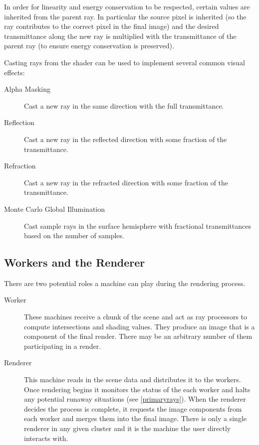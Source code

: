 \documentclass[12pt]{ucthesis}
\begin{document}
In order for linearity and energy conservation to be respected, certain values
are inherited from the parent ray. In particular the source pixel is inherited
(so the ray contributes to the correct pixel in the final image) and the
desired transmittance along the new ray is multiplied with the transmittance of
the parent ray (to ensure energy conservation is preserved).

Casting rays from the shader can be used to implement several common visual
effects:

\begin{description}
    \item[Alpha Masking] Cast a new ray in the same direction with the full
        transmittance.
    \item[Reflection] Cast a new ray in the reflected direction with some
        fraction of the transmittance.
    \item[Refraction] Cast a new ray in the refracted direction with some
        fraction of the transmittance.
    \item[Monte Carlo Global Illumination] Cast sample rays in the surface
        hemisphere with fractional transmittances based on the number of samples.
\end{description}

\subsection{Workers and the Renderer}
\label{workers}

There are two potential roles a machine can play during the rendering process.

\begin{description}
    \item[Worker] These machines receive a chunk of the scene and act as ray
        processors to compute intersections and shading values. They produce
        an image that is a component of the final render. There may be an
        arbitrary number of them participating in a render.
    \item[Renderer] This machine reads in the scene data and distributes it to
        the workers. Once rendering begins it monitors the status of the each
        worker and halts any potential runaway situations (see \ref{primaryrays}).
        When the renderer decides the process is complete, it requests
        the image components from each worker and merges them into the final
        image. There is only a single renderer in any given cluster and it is
        the machine the user directly interacts with.
\end{description}
\end{document}
